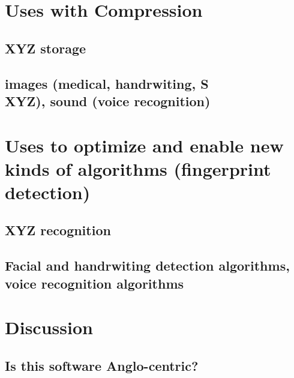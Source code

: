 \documentclass[12pt]{report}
\begin{document}
    \chapter{Uses with Compression}
    \section{XYZ storage}
    \blindtext[1]
    \section{images (medical, handrwiting, S\\XYZ), sound (voice recognition)}
    \blindtext[1]
    
    \chapter{Uses to optimize and enable new kinds of algorithms (fingerprint detection)}
    \section{XYZ recognition}
    \blindtext[1]
    \section{Facial and handrwiting detection algorithms, voice recognition algorithms}
    \blindtext[1]

    \chapter{Discussion}
    \section{Is this software Anglo-centric?}
    \blindtext[1]
    
    \pagebreak
    
    
    
    
\end{document}
